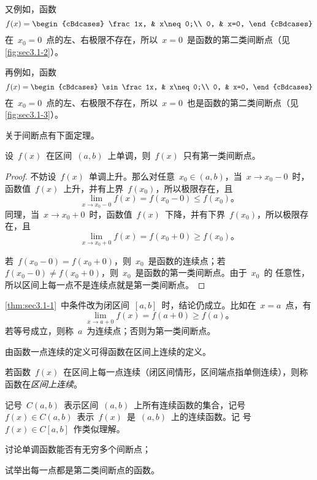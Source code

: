 又例如，函数
\[
  f(x)=\begin{cBdcases}
    \frac1x, & x\neq0;\\
    0, & x=0,
  \end{cBdcases}
\]
在~$x_0=0$~点的左、右极限不存在，所以~$x=0$~是函数的第二类间断点（见\ref{fig:sec3.1-2}）。

再例如，函数
\[
  f(x)=\begin{cBdcases}
    \sin\frac1x, & x\neq0;\\
    0, & x=0,
  \end{cBdcases}
\]
在~$x_0=0$~点的左、右极限不存在，所以~$x=0$~也是函数的第二类间断点（见\ref{fig:sec3.1-3}）。

关于间断点有下面定理。

\begin{theorem}\label{thm:sec3.1-1}
设~$f(x)$~在区间~$(a,b)$~上单调，则~$f(x)$~只有第一类间断点。
\end{theorem}
\begin{proof}
不妨设~$f(x)$~单调上升。那么对任意~$x_0\in(a,b)$，当~$x\to x_0-0$~时，函数值~$f(x)$~上升，并有上界~$f(x_0)$，所以极限存在，且
\[
  \lim_{x\to x_0-0}f(x)=f(x_0-0)\leq f(x_0) 。
\]
同理，当~$x\to x_0+0$~时，函数值~$f(x)$~下降，并有下界~$f(x_0)$，所以极限存在，且
\[
  \lim_{x\to x_0+0}f(x)=f(x_0+0)\geq f(x_0) 。
\]

若~$f(x_0-0)=f(x_0+0)$，则~$x_0$~是函数的连续点；若~$f(x_0-0)\neq f(x_0+0)$，则~$x_0$~是函数的第一类间断点。由于~$x_0$~的
任意性，所以区间上每一点不是连续点就是第一类间断点。
\end{proof}

\begin{remark}
\ref{thm:sec3.1-1}~中条件改为闭区间~$[a,b]$~时，结论仍成立。比如在~$x=a$~点，有
\[
  \lim_{x\to a+0}f(x)=f(a+0)\geq f(a)。
\]
若等号成立，则称~$a$~为连续点；否则为第一类间断点。
\end{remark}

由函数一点连续的定义可得函数在区间上连续的定义。

\begin{definition}
若函数~$f(x)$~在区间上每一点连续（闭区间情形，区间端点指单侧连续），则称函数在\emph{区间上连续}。
\end{definition}

记号~$C(a,b)$~表示区间~$(a,b)$~上所有连续函数的集合，记号~$f(x)\in C(a,b)$~表示~$f(x)$~是~$(a,b)$~上的连续函数。记
号~$f(x)\in C[a,b]$~作类似理解。

\begin{quiz}
\begin{thmenumlist}
\item 讨论单调函数能否有无穷多个间断点；
\item 试举出每一点都是第二类间断点的函数。
\end{thmenumlist}
\end{quiz}

